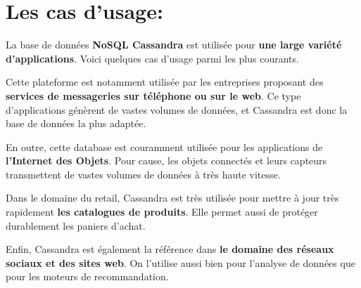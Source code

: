 \section{Les cas d’usage:}
La base de données \textbf{NoSQL Cassandra} est utilisée pour\textbf{ une large variété d’applications}. Voici quelques cas d’usage parmi les plus courants.

Cette plateforme est notamment utilisée par les entreprises proposant des \textbf{services de messageries sur téléphone ou sur le web}. Ce type d’applications génèrent de vastes volumes de données, et Cassandra est donc la base de données la plus adaptée.

En outre, cette database est couramment utilisée pour les applications de\textbf{ l’Internet des Objets}. Pour cause, les objets connectés et leurs capteurs transmettent de vastes volumes de données à très haute vitesse.

Dans le domaine du retail, Cassandra est très utilisée pour mettre à jour très rapidement \textbf{les catalogues de produits}. Elle permet aussi de protéger durablement les paniers d’achat.

Enfin, Cassandra est également la référence dans \textbf{le domaine des réseaux sociaux et des sites web}. On l’utilise aussi bien pour l’analyse de données que pour les moteurs de recommandation.